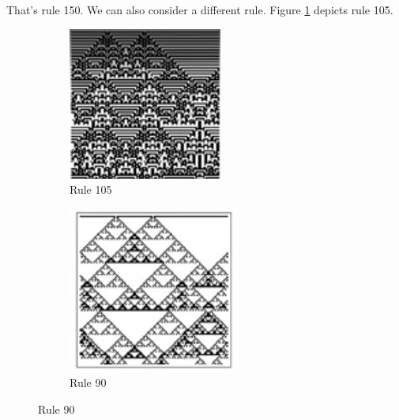 \documentclass[]{article}
\begin{document}
That's rule 150. We can also consider a different rule. Figure \ref{fig:cellular-automaton-rule-4} depicts rule 105.
\begin{figure}[H]
	\begin{center}
		\caption{Three different rules}
		\begin{subfigure}[t]{0.3\textwidth}
			\caption{Rule 105}\label{fig:cellular-automaton-rule-4}
			\includegraphics[width=\textwidth]{cellular-automaton-rule-4}
		\end{subfigure}
		\begin{subfigure}[t]{0.3\textwidth}
			\caption{Rule 90}\label{fig:cellular-automaton-rule-5}
			\includegraphics[width=\textwidth]{cellular-automaton-rule-5}

\end{subfigure}
\end{center}
\end{figure}
\end{document}
